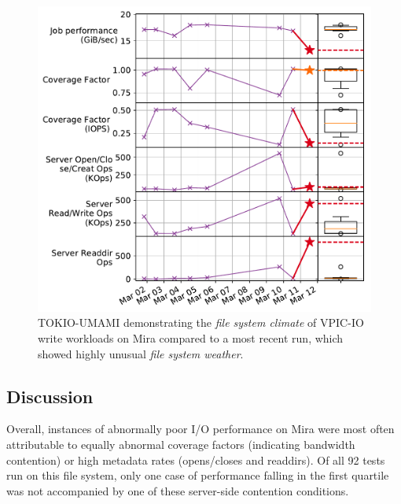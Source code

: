 \begin{figure}[t]
    \centering
    \includegraphics[width=1.0\columnwidth]{figs/umami-mira-fs1-vpic-write.pdf}
    \caption{TOKIO-UMAMI demonstrating the \emph{file system climate} of VPIC-IO write workloads
    on Mira compared to a most recent run, which showed
    highly unusual \emph{file system weather}.}
    \label{fig:umami-mira-fs1-vpic-write}
\end{figure}

\subsection{Discussion} \label{sec:results/discussion}

Overall, instances of abnormally poor I/O performance on Mira were most often attributable to equally abnormal coverage factors (indicating bandwidth contention) or high metadata rates (opens/closes and readdirs).  Of all 92 tests run on this file system, only one case of performance falling in the first quartile was not accompanied by one of these server-side contention conditions.

